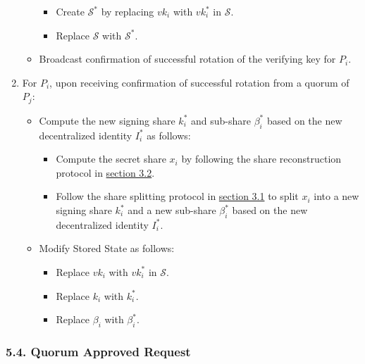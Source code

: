 \documentclass[
]{article}
\providecommand{\tightlist}{%
  \setlength{\itemsep}{0pt}\setlength{\parskip}{0pt}}
\begin{document}
\begin{enumerate}
\begin{itemize}
    \begin{itemize}
    \tightlist
    \item
      Create \(\mathcal{S} ^ \ast\) by replacing \(vk_i\) with
      \(vk_i^ \ast\) in \(\mathcal{S}\).
    \item
      Replace \(\mathcal{S}\) with \(\mathcal{S} ^ \ast\).
    \end{itemize}
  \item
    Broadcast confirmation of successful rotation of the verifying key
    for \(P_i\).
  \end{itemize}
\item
  For \(P_i\), upon receiving confirmation of successful rotation from a
  quorum of \(P_j\):

  \begin{itemize}
  \tightlist
  \item
    Compute the new signing share \(k_i^ \ast\) and sub-share
    \(\beta _i^ \ast\) based on the new decentralized identity
    \(I_i^ \ast\) as follows:

    \begin{itemize}
    \tightlist
    \item
      Compute the secret share \(x_i\) by following the share
      reconstruction protocol in
      \protect\hyperlink{share-reconstruction}{section 3.2}.
    \item
      Follow the share splitting protocol in
      \protect\hyperlink{share-splitting}{section 3.1} to split \(x_i\)
      into a new signing share \(k_i^ \ast\) and a new sub-share
      \(\beta _i^ \ast\) based on the new decentralized identity
      \(I_i^ \ast\).
    \end{itemize}
  \item
    Modify Stored State as follows:

    \begin{itemize}
    \tightlist
    \item
      Replace \(vk_i\) with \(vk_i^ \ast\) in \(\mathcal{S}\).
    \item
      Replace \(k_i\) with \(k_i^ \ast\).
    \item
      Replace \(\beta _i\) with \(\beta _i^ \ast\).
    \end{itemize}
  \end{itemize}
\end{enumerate}

\hypertarget{quorum-approved-request}{%
\subsubsection{5.4. Quorum Approved
Request}\label{quorum-approved-request}}
\end{document}
